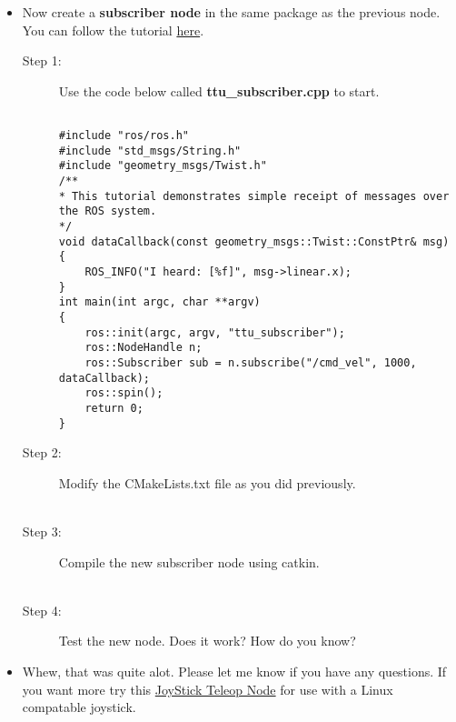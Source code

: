 \documentclass[12pt]{article}
\newcommand{\R}{\color{red}}
\newcommand{\K}{\color{black}}
\newcommand{\G}{\color{mygreen}}
\newcommand{\PR}{\color{mypurple}}
\newcommand{\pkgname}{\G<package\_name>\K}
\newcommand{\wspname}{\R<workspace\_name>\K}
\newcommand{\nodname}{\PR<node\_name>\K}
\newcommand{\home}{\textasciitilde/}
\begin{document}
\begin{itemize}
\item Now create a {\bf subscriber node} in the same package as the previous node. You can follow the tutorial \href{http://wiki.ros.org/ROS/Tutorials/WritingPublisherSubscriber(c++)} {here}. 

\begin{description}
\item [Step 1:] Use the code below called {\bf ttu\_subscriber.cpp} to start.\\

\begin{lstlisting}

#include "ros/ros.h"
#include "std_msgs/String.h"
#include "geometry_msgs/Twist.h"
/**
* This tutorial demonstrates simple receipt of messages over the ROS system.
*/
void dataCallback(const geometry_msgs::Twist::ConstPtr& msg)
{
	ROS_INFO("I heard: [%f]", msg->linear.x);
}
int main(int argc, char **argv)
{
	ros::init(argc, argv, "ttu_subscriber");
	ros::NodeHandle n;
	ros::Subscriber sub = n.subscribe("/cmd_vel", 1000, dataCallback);
	ros::spin();
	return 0;
}

\end{lstlisting}


\item [Step 2:] Modify the CMakeLists.txt file as you did previously. \\\\

\item [Step 3:] Compile the new subscriber node using catkin. \\\\



\item [Step 4:] Test the new node. Does it work? How do you know?\\


\end{description}
\vspace*{20mm}
\item Whew, that was quite alot. Please let me know if you have any questions. If you want more try this \href{http://wiki.ros.org/joy/Tutorials/WritingTeleopNode}{JoyStick Teleop Node} for use with a Linux compatable joystick.\\ 

\end{itemize}
\end{document}
